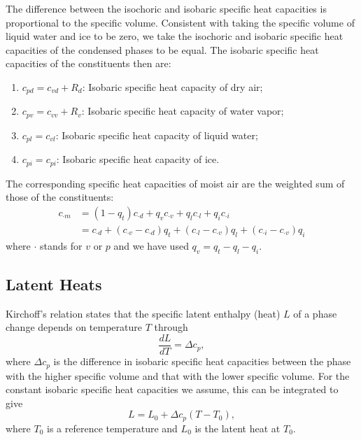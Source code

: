 \documentclass{article}
\begin{document}
The difference between the isochoric and isobaric specific heat capacities is proportional to the specific volume. Consistent with taking the specific volume of liquid water and ice to be zero, we take the isochoric and isobaric specific heat capacities of the condensed phases to be equal. The isobaric specific heat capacities of the constituents then are:
\begin{enumerate}
    \item $c_{pd} = c_{vd} + R_d$: Isobaric specific heat capacity of dry air;
    \item $c_{pv} = c_{vv} + R_v$: Isobaric specific heat capacity of water vapor;
    \item $c_{pl} = c_{vl}$: Isobaric specific heat capacity of liquid water;
    \item $c_{pi} = c_{pi}$: Isobaric specific heat capacity of ice.
\end{enumerate}

The corresponding specific heat capacities of moist air are the weighted sum of those of the constituents:
\begin{align}
    c_{\cdot m} & = (1-q_t) c_{\cdot d} + q_v c_{\cdot v} + q_l c_{\cdot l} + q_i c_{\cdot i}\\
    & = c_{\cdot d} + (c_{\cdot v} - c_{\cdot d})q_t + (c_{\cdot l} - c_{\cdot v})q_l + (c_{\cdot i} - c_{\cdot v})q_i
\end{align}
where $\cdot$ stands for $v$ or $p$ and we have used $q_v = q_t -q_l - q_i$.

\subsection{Latent Heats}

Kirchoff's relation states that the specific latent enthalpy (heat) $L$ of a phase change depends on temperature $T$ through
\begin{equation}
    \frac{dL}{dT} = \Delta c_p,
\end{equation}
where $\Delta c_p$ is the difference in isobaric specific heat capacities between the phase with the higher specific volume and that with the lower specific volume. For the constant isobaric specific heat capacities we assume, this can be integrated to give
\begin{equation}
    L = L_0 + \Delta c_p (T-T_0),
    \label{eq:LH_temperature}
\end{equation}
where $T_0$ is a reference temperature and $L_0$ is the latent heat at $T_0$. 
\end{document}
